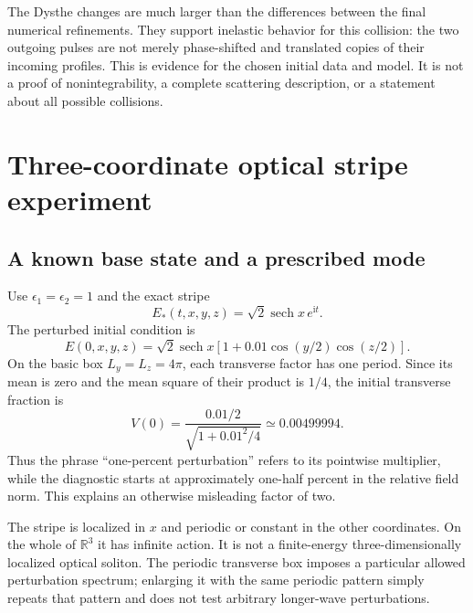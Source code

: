 \documentclass[10pt,letterpaper]{article}
\numberwithin{equation}{section}
\newcommand{\ii}{\mathrm{i}}
\newcommand{\R}{\mathbb R}
\begin{document}
The Dysthe changes are much larger than the differences between the final numerical refinements. They support inelastic behavior for this collision: the two outgoing pulses are not merely phase-shifted and translated copies of their incoming profiles. This is evidence for the chosen initial data and model. It is not a proof of nonintegrability, a complete scattering description, or a statement about all possible collisions.

\section{Three-coordinate optical stripe experiment}
\subsection{A known base state and a prescribed mode}
Use $\epsilon_1=\epsilon_2=1$ and the exact stripe
\begin{equation}
 E_*(t,x,y,z)=\sqrt2\operatorname{sech}x\,e^{\ii t}.
\end{equation}
The perturbed initial condition is
\begin{equation}\label{eq:stripepert}
 E(0,x,y,z)=\sqrt2\operatorname{sech}x
          [1+0.01\cos(y/2)\cos(z/2)].
\end{equation}
On the basic box $L_y=L_z=4\pi$, each transverse factor has one period. Since its mean is zero and the mean square of their product is $1/4$, the initial transverse fraction is
\begin{equation}
 V(0)=\frac{0.01/2}{\sqrt{1+0.01^2/4}}
       \simeq0.00499994.
\end{equation}
Thus the phrase ``one-percent perturbation'' refers to its pointwise multiplier, while the diagnostic starts at approximately one-half percent in the relative field norm. This explains an otherwise misleading factor of two.

The stripe is localized in $x$ and periodic or constant in the other coordinates. On the whole of $\R^3$ it has infinite action. It is not a finite-energy three-dimensionally localized optical soliton. The periodic transverse box imposes a particular allowed perturbation spectrum; enlarging it with the same periodic pattern simply repeats that pattern and does not test arbitrary longer-wave perturbations.
\end{document}

